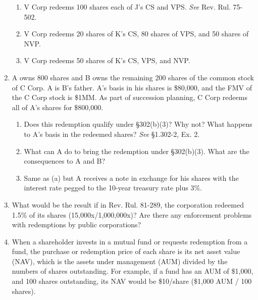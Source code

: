 \documentclass[12pt]{article}
\begin{document}
\begin{enumerate}
		\begin{enumerate}
		\item  V Corp redeems 100 shares each of J's CS and VPS.  \emph{See} Rev. Rul. 75-502.
		\item V Corp redeems 20 shares of K's CS, 80 shares of VPS, and 50 shares of NVP.
		\item V Corp redeems 50 shares of K's CS, VPS, and NVP.
		\end{enumerate}
		
	
	\item
		A owns 800 shares and B owns the remaining 200 shares of the common stock of C Corp.  A is B's father.  A's basis in his shares is  \$80,000, and the FMV of the C Corp stock is \$1MM.  As part of succession planning, C Corp redeems all of A's shares for \$800,000. 
		
			\begin{enumerate}
			\item Does this redemption qualify under \S302(b)(3)?  Why not? What happens to A's basis in the redeemed shares?  \emph{See} \S1.302-2, Ex. 2.
			\item What can A do to bring the redemption under  \S302(b)(3).  What are the consequences to A and B?
			\item Same as (a) but A receives a note in exchange for his shares with the interest rate pegged to the 10-year treasury rate plus 3\%.
			\end{enumerate}
		
	\item 
	
	What would be the result if in Rev. Rul. 81-289, the corporation redeemed 1.5\% of its shares (15,000x/1,000,000x)? Are there any enforcement problems with redemptions by public corporations?
	
	\item When a shareholder invests in a mutual fund or requests redemption from a fund, the purchase or redemption price of each share is its net asset value (NAV), which is the assets under management (AUM) divided by the numbers of shares outstanding.  For example, if a fund has an AUM of \$1,000, and 100 shares outstanding, its NAV would be \$10/share (\$1,000 AUM / 100 shares).  
	

\end{enumerate}
\end{document}
